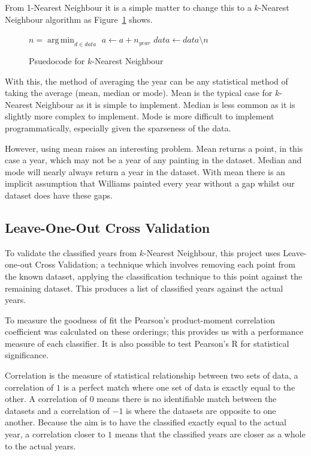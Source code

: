 From 1-Nearest Neighbour it is a simple matter to change this to a $k$-Nearest Neighbour algorithm
as Figure~\ref{fig:knn} shows.

\begin{figure}[h]
\begin{algorithmic}
\State $n = \operatorname*{arg\,min}_{d \in data}$ 
\State $a \gets a + n_{year}$
\State $data \gets data \setminus n$
\EndFor
\State \Return {}
\EndFunction
\end{algorithmic}
\caption{Psuedocode for $k$-Nearest Neighbour}\label{fig:knn}
\end{figure}

With this, the method of averaging the year can be any statistical method of taking the average
(mean, median or mode). Mean is the typical case for $k$-Nearest Neighbour as it is simple to
implement. Median is less common as it is slightly more complex to implement. Mode is more 
difficult to implement programmatically, especially given the sparseness of the data. 

However, using mean raises an interesting problem. Mean returns a point, in this case a year, 
which may not be a year of any painting in the dataset. Median and mode will nearly always return
a year in the dataset. With mean there is an implicit assumption that Williams painted every year
without a gap whilst our dataset does have these gaps. 


\subsection{Leave-One-Out Cross Validation}
To validate the classified years from $k$-Nearest Neighbour, this project uses Leave-one-out Cross
Validation; a technique which involves removing each point from the known dataset, applying the
classification technique to this point against the remaining dataset. This produces a list of
classified years against the actual years.

To measure the goodness of fit the Pearson's product-moment correlation coefficient was 
calculated on these orderings; this provides us with a performance measure of each classifier. 
It is also possible to test Pearson's R for statistical significance.

Correlation is the measure of statistical relationship between two sets of data, a correlation of
$1$ is a perfect match where one set of data is exactly equal to the other. A correlation of $0$
means there is no identifiable match between the datasets and a correlation of $-1$ is where the
datasets are opposite to one another. Because the aim is to have the classified exactly equal to
the actual year, a correlation closer to $1$ means that the classified years are closer as a whole
to the actual years.

